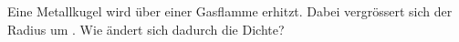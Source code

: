 Eine Metallkugel wird über einer Gasflamme erhitzt. Dabei vergrössert sich der Radius um \przO. Wie ändert sich dadurch die Dichte?
